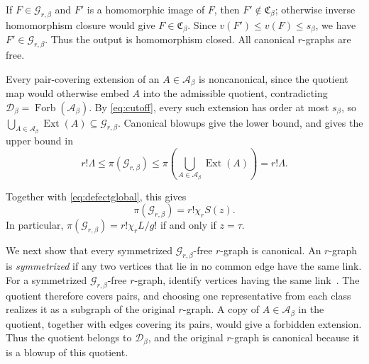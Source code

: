 \documentclass[10pt]{article}
\numberwithin{equation}{section}
\theoremstyle{definition}
\newcommand{\cA}{\mathcal A}\newcommand{\cB}{\mathcal B}\newcommand{\cC}{\mathcal C}
\newcommand{\cD}{\mathcal D}\newcommand{\cE}{\mathcal E}\newcommand{\cF}{\mathcal F}
\newcommand{\cG}{\mathcal G}\newcommand{\cH}{\mathcal H}\newcommand{\cJ}{\mathcal J}
\newcommand{\Forb}{\operatorname{Forb}}\newcommand{\Ext}{\operatorname{Ext}}
\begin{document}
If $F\in\cG_{r,\beta}$ and $F'$ is a homomorphic image of $F$, then $F'\notin\mathfrak C_\beta$; otherwise inverse homomorphism closure would give $F\in\mathfrak C_\beta$. Since $v(F')\le v(F)\le s_\beta$, we have $F'\in\cG_{r,\beta}$. Thus the output is homomorphism closed. All canonical $r$-graphs are free.

Every pair-covering extension of an $A\in\cA_\beta$ is noncanonical, since the quotient map would otherwise embed $A$ into the admissible quotient, contradicting $\cD_\beta=\Forb(\cA_\beta)$. By \eqref{eq:cutoff}, every such extension has order at most $s_\beta$, so $\bigcup_{A\in\cA_\beta}\Ext(A)\subseteq\cG_{r,\beta}$. Canonical blowups give the lower bound, and  gives the upper bound in
\[
 r!\Lambda\le\pi(\cG_{r,\beta})
 \le\pi\left(\bigcup_{A\in\cA_\beta}\Ext(A)\right)=r!\Lambda.
\]

Together with \eqref{eq:defectglobal}, this gives
\begin{equation}\label{eq:structrationalbaseline}
 \pi(\cG_{r,\beta})=r!\chi_r S(z).
\end{equation}
In particular, $\pi(\cG_{r,\beta})=r!\chi_r L/g!$ if and only if $z=\tau$.

We next show that every symmetrized $\cG_{r,\beta}$-free $r$-graph is canonical. An $r$-graph is \emph{symmetrized} if any two vertices that lie in no common edge have the same link. For a symmetrized $\cG_{r,\beta}$-free $r$-graph, identify vertices having the same link~\cite{LMR2023}. The quotient therefore covers pairs, and choosing one representative from each class realizes it as a subgraph of the original $r$-graph. A copy of $A\in\cA_\beta$ in the quotient, together with edges covering its pairs, would give a forbidden extension. Thus the quotient belongs to $\cD_\beta$, and the original $r$-graph is canonical because it is a blowup of this quotient.
\end{document}

